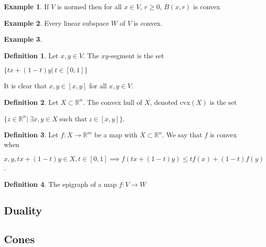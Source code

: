 \documentclass[]{article}
\theoremstyle{definition}
\newtheorem{definition}{Definition}[section]
\theoremstyle{definition}
\newtheorem{exmp}{Example}[section]
\newcommand{\raw}{\rightarrow}
\newcommand{\bb}{\mathbb}
\begin{document}
		
		
		\begin{exmp}
			If $V$ is normed then for all $x \in V$, $r \geq 0$, $B(x,r)$ is convex			
		\end{exmp}
	
	
		\begin{exmp}
			Every linear subspace $W$ of $V$ is convex.
		\end{exmp}

		\begin{exmp}
			
		\end{exmp}

		\begin{definition}
			Let $x, y \in V$. The $xy$-segment is the set 
			
			\begin{center}
				$\{ tx + (1-t)y| \ t \in [0, 1] \}$
			\end{center}
		\end{definition}

		It is clear that $x, y \in [x, y]$ for all $x, y \in V$.


		\begin{definition}
			Let $X \subset \bb{R}^n$. The convex hull of $X$, denoted cvx$(X)$ is the set 
			
			\begin{center}
				$\{ z \in \bb{R}^n| \ \exists x, y \in X \ \text{such that}\  z \in [x, y] \}$.
			\end{center}
		\end{definition}

		
		\begin{definition}
			Let $f: X \raw \bb{R}^m$ be a map with $X \subset \bb{R}^n$. We say that $f$ is convex when
			
			\begin{center}
				$x, y, tx + (1-t)y \in X, t \in [0, 1]  \implies f(tx + (1-t)y) \leq tf(x) + (1-t)f(y)$.
			\end{center}
			
		\end{definition}

		\begin{definition}
			The epigraph of a map $f: V \raw W$
		\end{definition}


		\subsection{Duality}
		\subsection{Cones}
	
\end{document}
